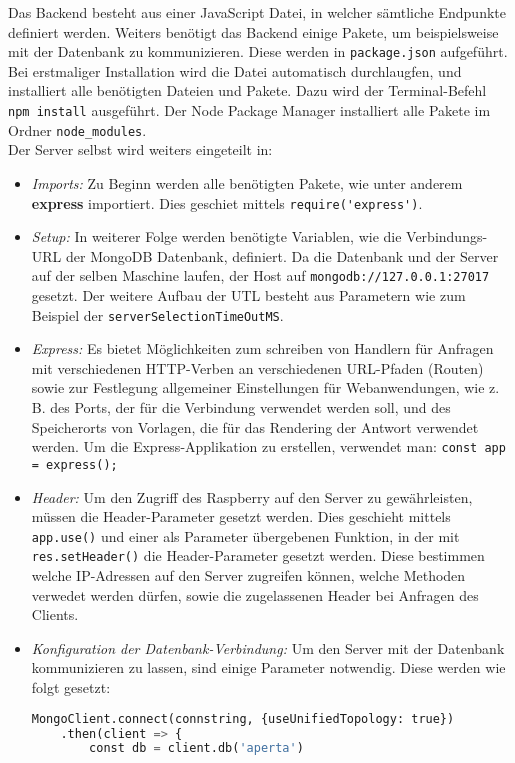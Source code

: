Das Backend besteht aus einer JavaScript Datei, in welcher sämtliche Endpunkte definiert werden. Weiters benötigt das Backend einige Pakete, um beispielsweise mit der Datenbank zu kommunizieren. Diese werden in \verb|package.json| aufgeführt. Bei erstmaliger Installation wird die Datei automatisch durchlaugfen, und installiert alle benötigten Dateien und Pakete. Dazu wird der Terminal-Befehl \verb|npm install| ausgeführt. Der Node Package Manager installiert alle Pakete im Ordner \verb|node_modules|.\\
Der Server selbst wird weiters eingeteilt in:

\begin{itemize}
    \item \textit{Imports: } Zu Beginn werden alle benötigten Pakete, wie unter anderem \textbf{express} importiert. Dies geschiet mittels \verb|require('express')|.
    \item \textit{Setup:  } In weiterer Folge werden benötigte Variablen, wie die Verbindungs-URL der MongoDB Datenbank, definiert. Da die Datenbank und der Server auf der selben Maschine laufen, der Host auf \verb|mongodb://127.0.0.1:27017| gesetzt. Der weitere Aufbau der UTL besteht aus Parametern wie zum Beispiel der \verb|serverSelectionTimeOutMS|.
    \item \textit{Express: }  Es bietet Möglichkeiten zum schreiben von Handlern für Anfragen mit verschiedenen HTTP-Verben an verschiedenen URL-Pfaden (Routen) sowie zur Festlegung allgemeiner Einstellungen für Webanwendungen, wie z. B. des Ports, der für die Verbindung verwendet werden soll, und des Speicherorts von Vorlagen, die für das Rendering der Antwort verwendet werden. Um die Express-Applikation zu erstellen, verwendet man: \verb|const app = express();|
    \item \textit{Header: } Um den Zugriff des Raspberry auf den Server zu gewährleisten, müssen die Header-Parameter gesetzt werden. Dies geschieht mittels \verb|app.use()| und einer als Parameter übergebenen Funktion, in der mit \verb|res.setHeader()| die Header-Parameter gesetzt werden. Diese bestimmen welche IP-Adressen auf den Server zugreifen können, welche Methoden verwedet werden dürfen, sowie die zugelassenen Header bei Anfragen des Clients.
    \item \textit{Konfiguration der Datenbank-Verbindung: } Um den Server mit der Datenbank kommunizieren zu lassen, sind einige Parameter notwendig. Diese werden wie folgt gesetzt: \begin{lstlisting}[language=Python, caption=Konfiguration der Datenbankanbindung, label=lst:impl:dbconf]
    MongoClient.connect(connstring, {useUnifiedTopology: true})
    .then(client => {
        const db = client.db('aperta')


\end{lstlisting}
\end{itemize}
